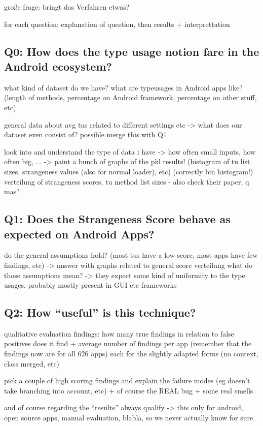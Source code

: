 große frage: bringt das Verfahren etwas?

for each question: explanation of question, then results + interprettation
\subsection{Q0: How does the type usage notion fare in the Android ecosystem?}
what kind of dataset do we have?
what are typeusages in Android apps like? (length of methods, percentage on Android framework, percentage on other stuff, etc)

general data about avg tus related to different settings etc -> what does our dataset even consist of?
possible merge this with Q1

look into and understand the type of data i have -> how often small inputs, how often big, ...
-> paint a bunch of graphs of the pkl results! (histogram of tu list sizes, strangeness values (also for normal loader), etc) (correctly bin histogram!)
verteilung of strangeness scores, tu method list sizes - also check their paper, q mas?

\subsection{Q1: Does the Strangeness Score behave as expected on Android Apps?}

do the general assumptions hold? (most tus have a low score, most apps have few findings, etc)
    -> answer with graphs related to general score verteilung
    what do those assumptions mean? -> they expect some kind of uniformity to the type usages, probably mostly present in GUI etc frameworks

\subsection{Q2: How ``useful'' is this technique?}
qualitative evaluation findings:
how many true findings in relation to false positives does it find + average number of findings per app (remember that the findings now are for all 626 apps)
each for the slightly adapted forms (no context, class merged, etc)

pick a couple of high scoring findings and explain the failure modes (eg doesn't take branching into account, etc)
+ of course the REAL bug + some real smells

and of course regarding the ``results'' always qualify -> this only for android, open source apps, manual evaluation, blabla, so we never actually know for sure

